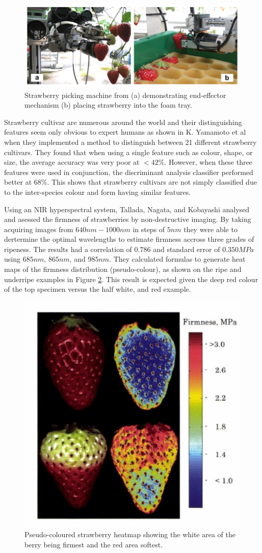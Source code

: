 \documentclass[fleqn,twoside]{article}
\begin{document}
\begin{figure}[h]
	\centering
	\includegraphics[width=0.9\linewidth]{strawberry_picker.png}
	\caption{Strawberry picking machine from \cite{hayashi} (a) demonstrating end-effector mechanism (b) placing strawberry into the foam tray.}
	\label{fig:strawberry_picker}
\end{figure}%


Strawberry cultivar are numerous around the world and their distinguishing features seem only obvious to expert humans as shown in K. Yamamoto et al \cite{yamamoto} when they implemented a method to distinguish between 21 different strawberry cultivars. They found that when using a single feature such as colour, shape, or size, the average accuracy was very poor at $<42\%$. However, when these three features were used in conjunction, the discriminant analysis classifier performed better at $68\%$. This shows that strawberry cultivars are not simply classified due to the inter-species colour and form having similar features. 


Using an NIR hyperspectral system, Tallada, Nagata, and Kobayashi \cite{tallada} analysed and asessed the firmness of strawberries by non-destructive imaging. By taking acquiring images from $640nm-1000nm$ in steps of $5nm$ they were able to dertermine the optimal wavelengths to estimate firmness accross three grades of ripeness. The results had a correlation of $0.786$ and standard error of $0.350MPa$ using $685nm$, $865nm$, and $985nm$. They calculated formulas to generate heat maps of the firmness distribution (pseudo-colour), as shown on the ripe and underripe examples in Figure \ref{fig:multispec_strawberry}. This result is expected given the deep red colour of the top specimen versus the half white, and red example.

\begin{figure}[h]
	\centering
	\includegraphics[width=0.5\linewidth]{multispec_strawberry.png}
	\caption{Pseudo-coloured strawberry heatmap showing the white area of the berry being firmest and the red area softest.}
	\label{fig:multispec_strawberry}
\end{figure}%
\end{document}
